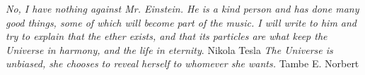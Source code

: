 
\textit{No, I have nothing against Mr. Einstein. He is a kind person and has done many good things, some of which will become part of the music. I will write to him and try to explain that the ether exists, and that its particles are what keep the Universe in harmony, and the life in eternity}. 
\newline
Nikola Tesla
\newline
\textit{The Universe is unbiased, she chooses to reveal herself to whomever she wants.}
\newline
Tambe E. Norbert


